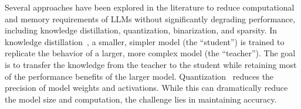 Several approaches have been explored in the literature to reduce computational and memory requirements of LLMs without significantly degrading performance, including knowledge distillation, quantization, binarization, and sparsity. In knowledge distillation~\cite{hinton2015distillingknowledgeneuralnetwork,sanh2019distilbert,gu2024minillm,liu-etal-2024-evolving,xu2024survey}, a smaller, simpler model (the ``student'') is trained to replicate the behavior of a larger, more complex model (the ``teacher''). The goal is to transfer the knowledge from the teacher to the student while retaining most of the performance benefits of the larger model. Quantization~\cite{xiao2023smoothquant,lin2024awq,lievaluating, wang2023bitnet,huangbillm,xu2024onebit,ma2024era, tang2024bi} reduces the precision of model weights and activations. While this can dramatically reduce the model size and computation, the challenge lies in maintaining accuracy.




